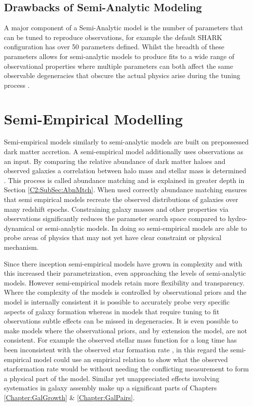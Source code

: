 \subsection{Drawbacks of Semi-Analytic Modeling}
A major component of a Semi-Analytic model is the number of parameters that can be tuned to reproduce observations, for example the default SHARK configuration has over 50 parameters defined. Whilst the breadth of these parameters allows for semi-analytic models to produce fits to a wide range of observational properties where multiple parameters can both affect the same observable degeneracies that obscure the actual physics arise during the tuning process \citep{Lapi2011DarkModels,Gonzalez2011Evolution4}.


\section{Semi-Empirical Modelling}
\label{sec:SEM}
Semi-empirical models similarly to semi-analytic models are built on prepossessed dark matter accretion. A semi-empirical model additionally uses observations as an input. By comparing the relative abundance of dark matter haloes and observed galaxies a correlation between halo mass and stellar mass is determined \citep{Kravtsov2004TheDistribution,Shankar2006NewFormation}. This process is called abundance matching and is explained in greater depth in Section \ref{C2:SubSec:AbnMtch}. When used correctly abundance matching ensures that semi empirical models recreate the observed distributions of galaxies over many redshift epochs. Constraining galaxy masses and other properties via observations significantly reduces the parameter search space compared to hydro-dynamical or semi-analytic models. In doing so semi-empirical models are able to probe areas of physics that may not yet have clear constraint or physical mechanism.

Since there inception semi-empirical models have grown in complexity and with this increased their parametrization, even approaching the levels of semi-analytic models. However semi-empirical models retain more flexibility and transparency. Where the complexity of the models is controlled by observational priors and the model is internally consistent it is possible to accurately probe very specific aspects of galaxy formation whereas in models that require tuning to fit observations subtle effects can be missed in degeneracies. It is even possible to make models where the observational priors, and by extension the model, are not consistent. For example the observed stellar mass function for a long time has been inconsistent with the observed star formation rate \citep{Leja2015ReconcilingFunction,Lapi2017StellarEquation}, in this regard the semi-empirical model could use an empirical relation to show what the observed starformation rate would be without needing the conflicting measurement to form a physical part of the model. Similar yet unappreciated effects involving systematics in galaxy assembly make up a significant parts of Chapters \ref{Chapter:GalGrowth} \& \ref{Chapter:GalPairs}.

